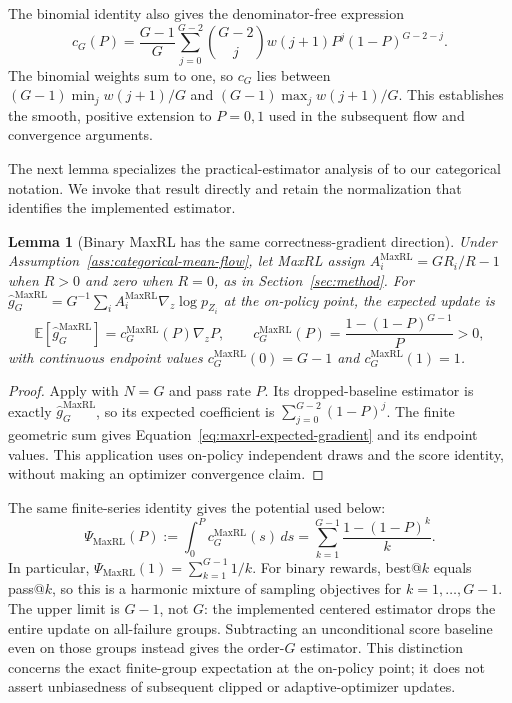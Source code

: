 \documentclass{article}
\newcommand{\enforcehalffinalproseline}{%
  \setlength{\parfillskip}{0pt plus .20\linewidth}}
\newcommand{\1}{\mathbf 1}
\newcommand{\E}{\mathbb E}
\newtheorem{lemma}{Lemma}[section]
\theoremstyle{remark}
\theoremstyle{definition}
\theoremstyle{plain}
\begin{document}
The binomial identity also gives the denominator-free expression
\[
 c_G(P)=\frac{G-1}{G}\sum_{j=0}^{G-2}\binom{G-2}{j}
 w(j+1)P^j(1-P)^{G-2-j}.
\]
The binomial weights sum to one, so $c_G$ lies between
$(G-1)\min_j w(j+1)/G$ and $(G-1)\max_j w(j+1)/G$.
This establishes the smooth, positive extension to $P=0,1$ used in the
subsequent flow and convergence arguments.

The next lemma specializes the practical-estimator analysis of
\citet[Section~4.3 and App.~D, Theorem~5]{tajwar2026maxrl}
to our categorical notation. We invoke that result directly and retain the
normalization that identifies the implemented estimator.

\begin{lemma}[Binary MaxRL has the same correctness-gradient direction]
\enforcehalffinalproseline
\label{lem:maxrl-mean}
Under Assumption~\ref{ass:categorical-mean-flow}, let MaxRL assign
$A_i^{\mathrm{MaxRL}}=GR_i/R-1$ when $R>0$ and zero when $R=0$, as in
Section~\ref{sec:method}. For
$\widehat g_G^{\mathrm{MaxRL}}=G^{-1}\sum_i
 A_i^{\mathrm{MaxRL}}\nabla_z\log p_{Z_i}$ at the on-policy point, the
expected update is
\begin{equation}
  \E[\widehat g_G^{\mathrm{MaxRL}}]
  =c_G^{\mathrm{MaxRL}}(P)\nabla_zP,
  \qquad
  c_G^{\mathrm{MaxRL}}(P)
  =\frac{1-(1-P)^{G-1}}{P}>0,
  \label{eq:maxrl-expected-gradient}
\end{equation}
with continuous endpoint values
$c_G^{\mathrm{MaxRL}}(0)=G-1$ and
$c_G^{\mathrm{MaxRL}}(1)=1$.
\end{lemma}

\begin{proof}
\enforcehalffinalproseline
Apply \citet[Theorem~5]{tajwar2026maxrl} with $N=G$ and pass rate $P$.
Its dropped-baseline estimator is exactly $\widehat g_G^{\mathrm{MaxRL}}$,
so its expected coefficient is $\sum_{j=0}^{G-2}(1-P)^j$.
The finite geometric sum gives Equation~\eqref{eq:maxrl-expected-gradient}
and its endpoint values. This application uses on-policy independent draws
and the score identity, without making an optimizer convergence claim.
\end{proof}

The same finite-series identity gives the potential used below:
\begin{equation}
 \Psi_{\mathrm{MaxRL}}(P)
 :=\int_0^P c_G^{\mathrm{MaxRL}}(s)\,ds
 =\sum_{k=1}^{G-1}\frac{1-(1-P)^k}{k}.
 \label{eq:maxrl-potential-finite-sum}
\end{equation}
In particular, $\Psi_{\mathrm{MaxRL}}(1)=\sum_{k=1}^{G-1}1/k$.
For binary rewards, best@\(k\) equals pass@\(k\), so this is a harmonic
mixture of sampling objectives for $k=1,\ldots,G-1$. The upper limit is
$G-1$, not $G$: the implemented centered estimator drops the entire update
on all-failure groups. Subtracting an unconditional score baseline even on
those groups instead gives the order-$G$ estimator. This distinction concerns
the exact finite-group expectation at the on-policy point; it does not assert
unbiasedness of subsequent clipped or adaptive-optimizer updates.
\end{document}
